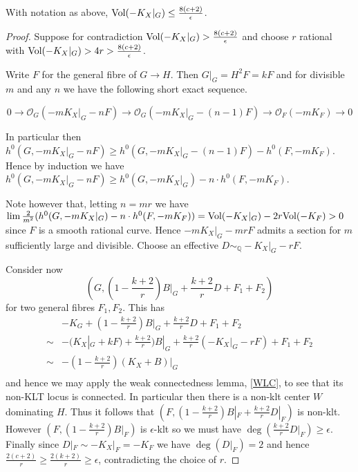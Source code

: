 \begin{lemma}\cite[Lemma 6.5]{jiang2014boundedness}
	With notation as above, $\text{Vol}(-K_{X}|_{G}) \leq \frac{8(c+2)}{\epsilon}$. 
\end{lemma}
\begin{proof}
	Suppose for contradiction $\text{Vol}(-K_{X}|_{G}) >\frac{8(c+2)}{\epsilon}$ and choose $r$ rational with $\text{Vol}(-K_{X}|_{G}) > 4r >\frac{8(c+2)}{\epsilon}$.
	
	Write $F$ for the general fibre of $G \to H$. Then $G|_{G}=H^{2}F=kF$ and for divisible $m$ and any $n$ we have the following short exact sequence.
	
	\[0 \to \mathcal{O}_{G}(-mK_{X}|_{G}-nF) \to \mathcal{O}_{G}(-mK_{X}|_{G}-(n-1)F) \to \mathcal{O}_{F}(-mK_{F}) \to 0\]
	
	In particular then $h^{0}(G,-mK_{X}|_{G}-nF) \geq h^{0}(G,-mK_{X}|_{G}-(n-1)F)-h^{0}(F,-mK_{F})$.
	Hence by induction we have $h^{0}(G,-mK_{X}|_{G}-nF) \geq h^{0}(G,-mK_{X}|_{G})-n\cdot h^{0}(F,-mK_{F})$.
	
	Note however that, letting $n=mr$ we have $\lim \frac{2}{m^{2}}(h^{0}(G,-mK_{X}|_{G})-n\cdot h^{0}(F,-mK_{F}))= \text{Vol}(-K_{X}|_{G})-2r\text{Vol}(-K_{F}) > 0$ since $F$ is a smooth rational curve. Hence $-mK_{X}|_{G}-mrF$ admits a section for $m$ sufficiently large and divisible. Choose an effective $D\sim_{\mathbb{Q}} -K_{X}|_{G}-rF$.
	
	Consider now \[(G,(1-\frac{k+2}{r})B|_{G}+\frac{k+2}{r}D+F_{1}+F_{2})\]
	for two general fibres $F_{1}, F_{2}$.
	This has \begin{align*}
	&-K_{G}+(1-\frac{k+2}{r})B|_{G}+\frac{k+2}{r}D+F_{1}+F_{2}	\\
	\sim & -(K_{X}|_{G}+kF)+\frac{k+2}{r})B|_{G}+\frac{k+2}{r}(-K_{X}|_{G}-rF)+F_{1}+F_{2} \\	
	\sim & -(1-\frac{k+2}{r})(K_{X}+B)|_{G} \\
	\end{align*}
	and hence we may apply the weak connectedness lemma, \autoref{WLC}, to see that its non-KLT locus is connected. In particular then there is a non-klt center $W$ dominating $H$. Thus it follows that $(F,(1-\frac{k+2}{r})B|_{F}+\frac{k+2}{r}D|_{F})$ is non-klt. However $(F,(1-\frac{k+2}{r})B|_{F})$ is $\epsilon$-klt so we must have $\deg (\frac{k+2}{r}D|_{F})\geq \epsilon$. Finally since $D|_{F}\sim -K_{X}|_{F}=-K_{F}$ we have $\deg(D|_{F})=2$ and hence $\frac{2(c+2)}{r} \geq \frac{2(k+2)}{r} \geq \epsilon$, contradicting the choice of $r$.
\end{proof}

